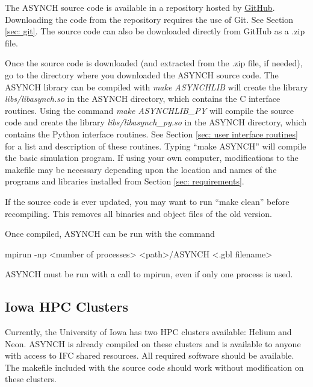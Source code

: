 \documentclass[12pt]{article}
\newenvironment{codeindent}
{\begin{list}{}
        {\setlength{\leftmargin}{.1in}}
        \item[]
}
{\end{list}}
\begin{document}
The ASYNCH source code is available in a repository hosted by \href{https://github.com/ssmall41/asynch}{GitHub}. Downloading the code from the repository requires the use of Git. See Section \ref{sec: git}. The source code can also be downloaded directly from GitHub as a .zip file.

Once the source code is downloaded (and extracted from the .zip file, if needed), go to the directory where you downloaded the ASYNCH source code. The ASYNCH library can be compiled with \emph{make ASYNCHLIB} will create the library \emph{libs/libasynch.so} in the ASYNCH directory, which contains the C interface routines. Using the command \emph{make ASYNCHLIB\_PY} will compile the source code and create the library \emph{libs/libasynch\_py.so} in the ASYNCH directory, which contains the Python interface routines. See Section \ref{sec: user interface routines} for a list and description of these routines. Typing ``make ASYNCH'' will compile the basic simulation program. If using your own computer, modifications to the makefile may be necessary depending upon the location and names of the programs and libraries installed from Section \ref{sec: requirements}.

If the source code is ever updated, you may want to run ``make clean'' before recompiling. This removes all binaries and object files of the old version.

Once compiled, ASYNCH can be run with the command
\begin{codeindent}
mpirun -np <number of processes> <path>/ASYNCH <.gbl filename> 
\end{codeindent}
ASYNCH must be run with a call to mpirun, even if only one process is used.

\subsection{Iowa HPC Clusters} \label{sec: iowa hpc clusters}

Currently, the University of Iowa has two HPC clusters available: Helium and Neon. ASYNCH is already compiled on these clusters and is available to anyone with access to IFC shared resources. All required software should be available. The makefile included with the source code should work without modification on these clusters.
\end{document}
